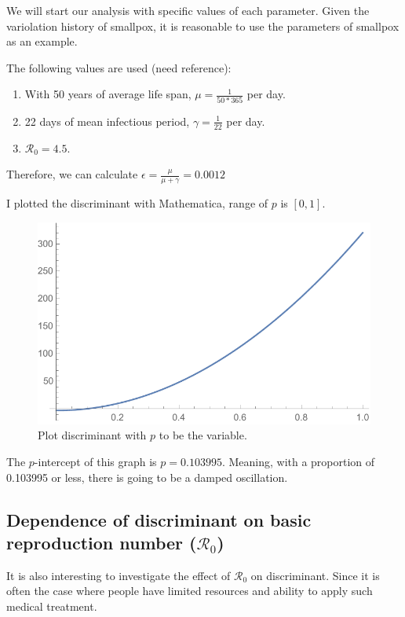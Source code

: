 \documentclass[12pt]{article}
\newcommand{\R}{\mathcal{R}}
\begin{document}
We will start our analysis with specific values of each parameter. Given the variolation history of smallpox, it is reasonable to use the parameters of smallpox as an example.

The following values are used (need reference): 
\begin{enumerate}
\item With 50 years of average life span, $\mu=\frac{1}{50*365}$ per day.
\item 22 days of mean infectious period, $\gamma=\frac{1}{22}$ per day.
\item $\R_0=4.5$.
\end{enumerate}
Therefore, we can calculate $\epsilon=\frac{\mu}{\mu+\gamma}=0.0012$

I plotted the discriminant with Mathematica, range of $p$ is $[0,1]$.

\begin{figure}[H]
  \caption{Plot discriminant with $p$ to be the variable.}
  \centering
  \includegraphics[width=1.1\textwidth]{Figures/Discriminant_plot_newborn.pdf}
\end{figure}

The $p$-intercept of this graph is $p=0.103995$. Meaning, with a proportion of 0.103995 or less, there is going to be a damped oscillation.

\subsection{Dependence of discriminant on basic reproduction number ($\R_0$)}
It is also interesting to investigate the effect of $\R_0$ on discriminant. Since it is often the case where people have limited resources and ability to apply such medical treatment.
\end{document}
